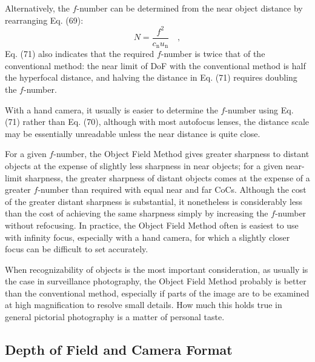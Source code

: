 \documentclass[11pt, oneside]{scrartcl}   	%
\begin{document}
Alternatively, the $f$-number can be determined from the near object distance by rearranging Eq. (69):
\begin{equation}
   N = \frac{f^2}{c_\mathrm{n}u_\mathrm{n}}\quad,
   \label{eq:71}
\end{equation}
Eq. (71) also indicates that the required $f$-number is twice that of the conventional method: the near limit of DoF with the conventional method is half the hyperfocal distance, and halving the distance in Eq. (71) requires doubling the $f$-number.

With a hand camera, it usually is easier to determine the $f$-number using Eq. (71) rather than Eq. (70), although with most autofocus lenses, the distance scale may be essentially unreadable unless the near distance is quite close.

For a given $f$-number, the Object Field Method gives greater sharpness to distant objects at the expense of slightly less sharpness in near objects; for a given near-limit sharpness, the greater sharpness of distant objects comes at the expense of a greater $f$-number than required with equal near and far CoCs. Although the cost of the greater distant sharpness is substantial, it nonetheless is considerably less than the cost of achieving the same sharpness simply by increasing the $f$-number without refocusing. In practice, the Object Field Method often is easiest to use with infinity focus, especially with a hand camera, for which a slightly closer focus can be difficult to set accurately.

When recognizability of objects is the most important consideration, as usually is the case in surveillance photography, the Object Field Method probably is better than the conventional method, especially if parts of the image are to be examined at high magnification to resolve small details. How much this holds true in general pictorial photography is a matter of personal taste.

\subsection{Depth of Field and Camera Format}
\end{document}
